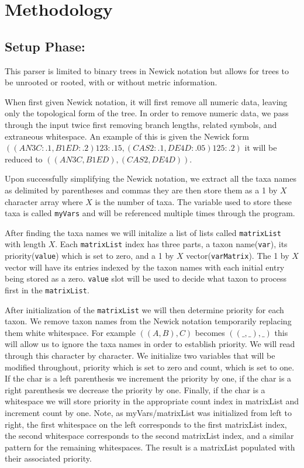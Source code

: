 \documentclass{article}
\begin{document}
\section{Methodology}
 
\subsection{Setup Phase:}

This parser is limited to binary trees in Newick notation but allows for trees to be unrooted or rooted, with or without metric information.

When first given Newick notation, it will first remove all numeric data, leaving only the topological form of the tree. In order to remove numeric data, we pass through the input twice first removing branch lengths, related symbols, and extraneous whitespace. An example of this is given the Newick form $((AN3C:.1,B1ED:.2)123:.15,(CAS2:.1,DE4D:.05 )125:.2)$ it will be reduced to $((AN3C,B1ED),(CAS2,DE4D))$. 

Upon successfully simplifying the Newick notation, we extract all the taxa names as delimited by parentheses and commas they are then store them as a 1 by $X$ character array where $X$ is the number of taxa. The variable used to store these taxa is called {\tt myVars} and will be referenced multiple times through the program. 

After finding the taxa names we will initalize a list of lists called {\tt matrixList} with length $X$. Each {\tt matrixList} index has three parts, a taxon name({\tt var}), its priority({\tt value}) which is set to zero, and a 1 by $X$ vector({\tt varMatrix}). The 1 by $X$ vector will have its entries indexed by the taxon names with each initial entry being stored as a zero. {\tt value} slot will be used to decide what taxon to process first in the {\tt matrixList}.

After initialization of the {\tt matrixList} we will then determine priority for each taxon. We remove taxon names from the Newick notation temporarily replacing them white whitespace. For example $((A,B),C)$ becomes $((\_,\_),\_)$ this will allow us to ignore the taxa names in order to establish priority. We will read through this character by character. We initialize two variables that will be modified throughout, priority which is set to zero and count, which is set to one. If the char is a left parenthesis we increment the priority by one, if the char is a right parenthesis we decrease the priority by one. Finally, if the char is a whitespace we will store priority in the appropriate count index in matrixList and increment count by one. Note, as myVars/matrixList was initialized from left to right, the first whitespace on the left corresponds to the first matrixList index, the second whitespace corresponds to the second matrixList index, and a similar pattern for the remaining whitespaces. The result is a matrixList populated with their associated priority. 
\end{document}
